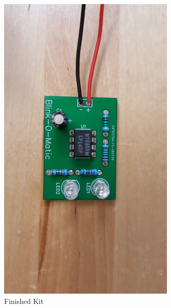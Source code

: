 \documentclass{article}
\begin{document}
\begin{enumerate}
\begin{figure}[H]
\caption{ Finished Kit }
\label{fig:img/0052.jpg}
\centering
\includegraphics[width=0.75\textwidth]{img/0052.jpg}
\end{figure}

    
  \end{enumerate}

  



    


  
\end{document}
